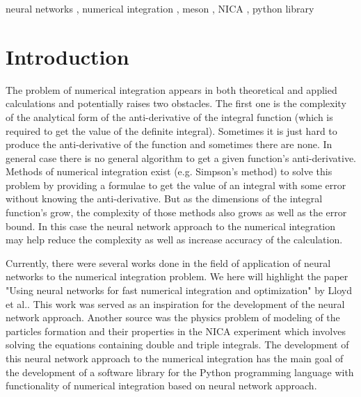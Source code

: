 \documentclass[%
]{ittmm}
\begin{document}
\begin{keywords}
  neural networks \sep
  numerical integration \sep
  meson \sep
  NICA \sep
  python library
\end{keywords}

\maketitle

\section{Introduction}

The problem of numerical integration appears in both theoretical and applied calculations and potentially raises two obstacles. The first one is the complexity of the analytical form of the anti-derivative of the integral function (which is required to get the value of the definite integral). Sometimes it is just hard to produce the anti-derivative of the function and sometimes there are none. In general case there is no general algorithm to get a given function's anti-derivative. Methods of numerical integration exist (e.g. Simpson's method) to solve this problem by providing a formulae to get the value of an integral with some error without knowing the anti-derivative. But as the dimensions of the integral function's grow, the complexity of those methods also grows as well as the error bound. In this case the neural network approach to the numerical integration may help reduce the complexity as well as increase accuracy of the calculation.

Currently, there were several works done in the field of application of neural networks to the numerical integration problem. We here will highlight the paper "Using neural networks for fast numerical integration and optimization" by Lloyd et al.\cite{lloyd2020using}. This work was served as an inspiration for the development of the neural network approach. Another source was the physics problem of modeling of the particles formation and their properties in the NICA experiment which involves solving the equations containing double and triple integrals. The development of this neural network approach to the numerical integration has the main goal of the development of a software library for the Python programming language with functionality of numerical integration based on neural network approach.
\end{document}
